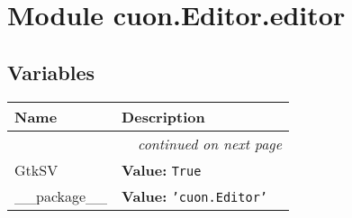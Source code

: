 %
%
%


\section{Module cuon.Editor.editor}

    \label{cuon:Editor:editor}


  \subsection{Variables}

    \vspace{-1cm}
\hspace{\varindent}\begin{longtable}{|p{\varnamewidth}|p{\vardescrwidth}|l}
\cline{1-2}
\cline{1-2} \centering \textbf{Name} & \centering \textbf{Description}& \\
\cline{1-2}
\endhead\cline{1-2}\multicolumn{3}{r}{\small\textit{continued on next page}}\\\endfoot\cline{1-2}
\endlastfoot\raggedright G\-t\-k\-S\-V\- & \raggedright \textbf{Value:} 
{\tt True}&\\
\cline{1-2}
\raggedright \_\-\_\-p\-a\-c\-k\-a\-g\-e\-\_\-\_\- & \raggedright \textbf{Value:} 
{\tt \texttt{'}\texttt{cuon.Editor}\texttt{'}}&\\
\cline{1-2}
\end{longtable}




